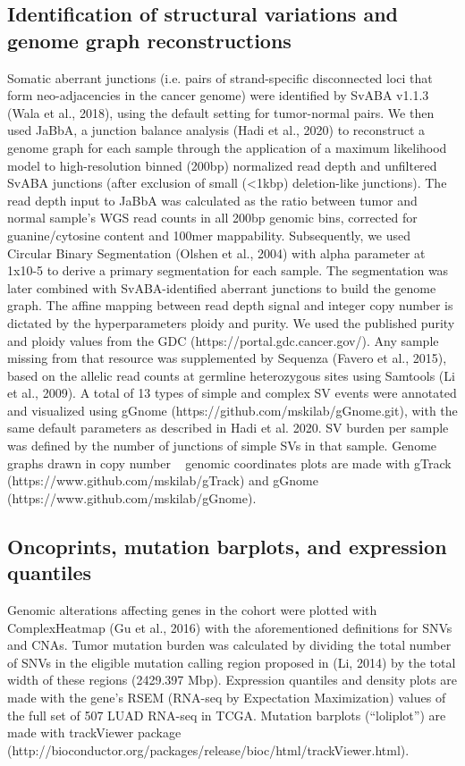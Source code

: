 \documentclass[phd,tocprelim]{cornell}
\begin{document}
\subsection*{Identification of structural variations and genome graph reconstructions}
Somatic aberrant junctions (i.e. pairs of strand-specific disconnected loci that form neo-adjacencies in the cancer genome) were identified by SvABA v1.1.3 (Wala et al., 2018), using the default setting for tumor-normal pairs. We then used JaBbA, a junction balance analysis (Hadi et al., 2020) to reconstruct a genome graph for each sample through the application of a maximum likelihood model to high-resolution binned (200bp) normalized read depth and unfiltered SvABA junctions (after exclusion of small (<1kbp) deletion-like junctions). The read depth input to JaBbA was calculated as the ratio between tumor and normal sample’s WGS read counts in all 200bp genomic bins, corrected for guanine/cytosine content and 100mer mappability. Subsequently, we used Circular Binary Segmentation (Olshen et al., 2004) with alpha parameter at 1x10-5 to derive a primary segmentation for each sample. The segmentation was later combined with SvABA-identified aberrant junctions to build the genome graph. The affine mapping between read depth signal and integer copy number is dictated by the hyperparameters ploidy and purity. We used the published purity and ploidy values from the GDC (https://portal.gdc.cancer.gov/). Any sample missing from that resource was supplemented by Sequenza (Favero et al., 2015), based on the allelic read counts at germline heterozygous sites using Samtools (Li et al., 2009). A total of 13 types of simple and complex SV events were annotated and visualized using gGnome (https://github.com/mskilab/gGnome.git), with the same default parameters as described in Hadi et al. 2020. SV burden per sample was defined by the number of junctions of simple SVs in that sample. Genome graphs drawn in copy number ~ genomic coordinates plots are made with gTrack (https://www.github.com/mskilab/gTrack) and gGnome (https://www.github.com/mskilab/gGnome). 

\subsection*{Oncoprints, mutation barplots, and expression quantiles}
Genomic alterations affecting genes in the cohort were plotted with ComplexHeatmap (Gu et al., 2016) with the aforementioned definitions for SNVs and CNAs. Tumor mutation burden was calculated by dividing the total number of SNVs in the eligible mutation calling region proposed in (Li, 2014) by the total width of these regions (2429.397 Mbp). Expression quantiles and density plots are made with the gene’s RSEM (RNA-seq by Expectation Maximization) values of the full set of 507 LUAD RNA-seq in TCGA. Mutation barplots (“loliplot”) are made with trackViewer package (http://bioconductor.org/packages/release/bioc/html/trackViewer.html).
\end{document}
